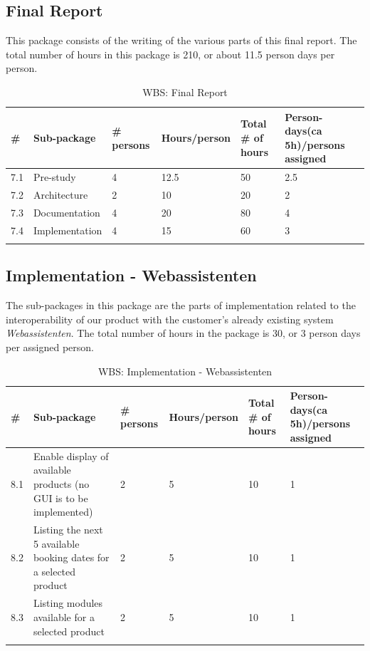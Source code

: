 \subsection{Final Report}
This package consists of the writing of the various parts of this final report. The total number of hours in this package is 210, or about 11.5 person days per person.
\begin{longtable}{|p{0.7cm}|p{3cm}|p{1.8cm}|p{2.5cm}|p{2cm}|p{2.8cm}|}
\hline
\# & Sub-package & \# persons & Hours/person & Total \# of hours & Person-days(ca 5h)/persons assigned\\ 
\hline
7.1 & Pre-study & 4 & 12.5 & 50 & 2.5\\ 
\hline
7.2 & Architecture & 2 & 10 & 20 & 2\\ 
\hline
7.3 & Documentation & 4 & 20 & 80 & 4\\ 
\hline
7.4 & Implementation & 4 & 15 & 60 & 3\\ 
\hline
\caption{WBS: Final Report}
\end{longtable}

\newpage
\subsection{Implementation - Webassistenten}
The sub-packages in this package are the parts of implementation related to the interoperability of our product with the customer's already existing system \\ \emph{Webassistenten}. The total number of hours in the package is 30, or 3 person days per assigned person.
\begin{longtable}{|p{0.7cm}|p{3cm}|p{1.8cm}|p{2.5cm}|p{2cm}|p{2.8cm}|}
\hline
\# & Sub-package & \# persons & Hours/person & Total \# of hours & Person-days(ca 5h)/persons assigned\\ 
\hline
8.1 & Enable display of available products (no GUI is to be implemented) & 2 & 5 & 10 & 1\\ 
\hline
8.2 & Listing the next 5 available booking dates for a selected product & 2 & 5 & 10 & 1\\ 
\hline
8.3 & Listing modules available for a selected product & 2 & 5 & 10 & 1\\ 
\hline
\caption{WBS: Implementation - Webassistenten}
\end{longtable}

\newpage
